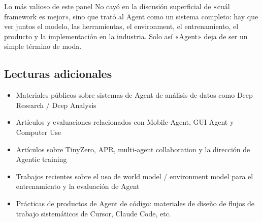 \documentclass[a4paper]{article}
\begin{document}
\begin{importantbox}{Lo más valioso de este panel}
No cayó en la discusión superficial de «cuál framework es mejor», sino que trató al Agent como un sistema completo: hay que ver juntos el modelo, las herramientas, el environment, el entrenamiento, el producto y la implementación en la industria. Solo así «Agent» deja de ser un simple término de moda.
\end{importantbox}

\subsection{Lecturas adicionales}
\begin{itemize}
  \item Materiales públicos sobre sistemas de Agent de análisis de datos como Deep Research / Deep Analysis
  \item Artículos y evaluaciones relacionados con Mobile-Agent, GUI Agent y Computer Use
  \item Artículos sobre TinyZero, APR, multi-agent collaboration y la dirección de Agentic training
  \item Trabajos recientes sobre el uso de world model / environment model para el entrenamiento y la evaluación de Agent
  \item Prácticas de productos de Agent de código: materiales de diseño de flujos de trabajo sistemáticos de Cursor, Claude Code, etc.
\end{itemize}
\end{document}
